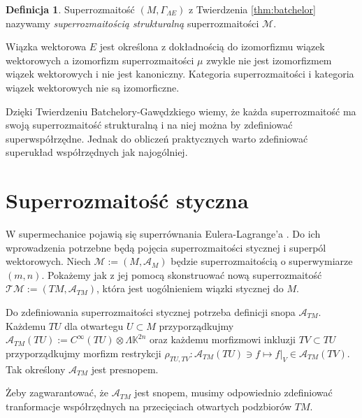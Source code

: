 \documentclass[11pt,a4paper]{report}
\theoremstyle{definition}
\newtheorem{definition}[theorem]{Definicja}
\begin{document}
\begin{definition}
	Superrozmaitość $(M, \Gamma_{\Lambda E})$ z Twierdzenia \ref{thm:batchelor} nazywamy \textit{superrozmaitością strukturalną} superrozmaitości $\mathcal{M}$.
\end{definition}
		      			
Wiązka wektorowa $E$ jest określona z dokładnością do izomorfizmu wiązek wektorowych a izomorfizm superrozmaitości $\mu$ zwykle nie jest izomorfizmem wiązek wektorowych i nie jest kanoniczny. Kategoria superrozmaitości i kategoria wiązek wektorowych nie są izomorficzne.
		      			
Dzięki Twierdzeniu Batchelory-Gawędzkiego wiemy, że każda superrozmaitość ma swoją superrozmaitość strukturalną i na niej można by zdefiniować superwspółrzędne. Jednak do obliczeń praktycznych warto zdefiniować superukład współrzędnych jak najogólniej.
		      			
\section{Superrozmaitość styczna}
		      			
W supermechanice pojawią się superrównania Eulera-Lagrange'a \cite{carinena}. Do ich wprowadzenia potrzebne będą pojęcia superrozmaitości stycznej i superpól wektorowych. Niech $\mathcal{M} := (M, \mathcal{A}_M)$ będzie superrozmaitością o superwymiarze $(m,n)$. Pokażemy jak z jej pomocą skonstruować nową superrozmaitość $\mathcal{T} \mathcal{M} := (TM, \mathcal{A}_{TM})$, która jest uogólnieniem wiązki stycznej do $M$.
		      			
Do zdefiniowania superrozmaitości stycznej potrzeba definicji snopa $\mathcal{A}_{TM}$. Każdemu $TU$ dla otwartegu $U \subset M$ przyporządkujmy $\mathcal{A}_{TM}(TU) := C^\infty (TU) \otimes \Lambda \mathbb{K}^{2n}$ oraz każdemu morfizmowi inkluzji $TV \subset TU$ przyporządkujmy morfizm restrykcji $\rho_{TU,TV}: \mathcal{A}_{TM}(TU) \ni f \mapsto f|_{V} \in \mathcal{A}_{TM}(TV)$. Tak określony $\mathcal{A}_{TM}$ jest presnopem.
		      			
Żeby zagwarantować, że $\mathcal{A}_{TM}$ jest snopem, musimy odpowiednio zdefiniować tranformacje współrzędnych na przecięciach otwartych podzbiorów $TM$. 
		      			
\end{document}
